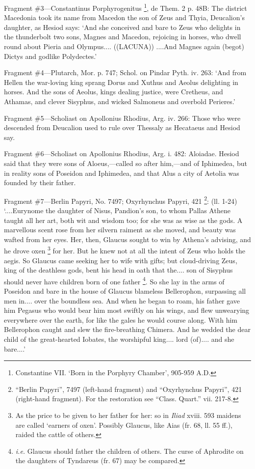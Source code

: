 Fragment \#3—Constantinus Porphyrogenitus \footnote{Constantine VII.
‘Born in the Porphyry Chamber’, 905-959 A.D.}, de Them.
2 p. 48B: The district Macedonia took its name from Macedon the son of Zeus and
Thyia, Deucalion’s daughter, as Hesiod says: ‘And she conceived and
bare to Zeus who delights in the thunderbolt two sons, Magnes and Macedon,
rejoicing in horses, who dwell round about Pieria and Olympus.... ((LACUNA))
....And Magnes again (begot) Dictys and godlike Polydectes.’

Fragment \#4—Plutarch, Mor. p. 747; Schol. on Pindar Pyth. iv. 263:
‘And from Hellen the war-loving king sprang Dorus and Xuthus and Aeolus
delighting in horses. And the sons of Aeolus, kings dealing justice, were
Cretheus, and Athamas, and clever Sisyphus, and wicked Salmoneus and overbold
Perieres.’

Fragment \#5—Scholiast on Apollonius Rhodius, Arg. iv. 266: Those who were
descended from Deucalion used to rule over Thessaly as Hecataeus and Hesiod
say.

Fragment \#6—Scholiast on Apollonius Rhodius, Arg. i. 482: Aloiadae.
Hesiod said that they were sons of Aloeus,—called so after him,—and
of Iphimedea, but in reality sons of Poseidon and Iphimedea, and that Alus a
city of Aetolia was founded by their father.

Fragment \#7—Berlin Papyri, No. 7497; Oxyrhynchus Papyri, 421 \footnote{“Berlin
Papyri”, 7497 (left-hand fragment) and “Oxyrhynchus Papyri”,
421 (right-hand fragment). For the restoration see “Class. Quart.”
vii. 217-8.}: (ll. 1-24) ‘....Eurynome
the daughter of Nisus, Pandion’s son, to whom Pallas Athene taught all
her art, both wit and wisdom too; for she was as wise as the gods. A marvellous
scent rose from her silvern raiment as she moved, and beauty was wafted from
her eyes. Her, then, Glaucus sought to win by Athena’s advising, and he
drove oxen \footnote{As the price to be given
to her father for her: so in \emph{Iliad} xviii. 593 maidens are called
‘earners of oxen’. Possibly Glaucus, like Aias (fr. 68, ll. 55
ff.), raided the cattle of others.} for her. But he knew not at all
the intent of Zeus who holds the aegis. So Glaucus came seeking her to wife
with gifts; but cloud-driving Zeus, king of the deathless gods, bent his head
in oath that the.... son of Sisyphus should never have children born of one
father \footnote{\emph{i.e.} Glaucus should father
the children of others. The curse of Aphrodite on the daughters of Tyndareus
(fr. 67) may be compared.}. So she lay in the arms of
Poseidon and bare in the house of Glaucus blameless Bellerophon, surpassing all
men in.... over the boundless sea. And when he began to roam, his father gave
him Pegasus who would bear him most swiftly on his wings, and flew unwearying
everywhere over the earth, for like the gales he would course along. With him
Bellerophon caught and slew the fire-breathing Chimera. And he wedded the dear
child of the great-hearted Iobates, the worshipful king.... lord (of).... and
she bare....’

